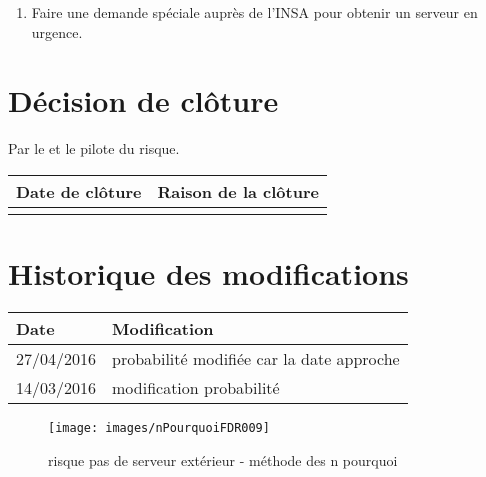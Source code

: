 \begin{enumerate}
	\item Faire une demande spéciale auprès de l'INSA pour obtenir un serveur en urgence.
\end{enumerate}

%
%
%
%

\section*{Décision de clôture}
Par le \CP{} et le pilote du risque.
\begin{table}[H]
\centering
	\begin{tabularx}{16.8cm}{|X|X|}
	\hline
	\rowcolor{gray!40} Date de clôture & Raison de la clôture \\
	\hline
	  & \\
	\hline
	\end{tabularx}
\end{table}

\section*{Historique des modifications}
\begin{table}[H]
\centering
	\begin{tabularx}{16.8cm}{|X|X|}
	\hline
	\rowcolor{gray!40} Date & Modification \\
	\hline
	 27/04/2016 & probabilité modifiée car la date approche \\
	\hline
	 14/03/2016 & modification probabilité \\
	\hline
	\end{tabularx}
\end{table}
\newpage

\begin{figure}
	\centering
	\texttt{[image: images/nPourquoiFDR009]}
	\caption{\label{risque pas de serveur ext}risque pas de serveur extérieur - méthode des n pourquoi}
\end{figure}
